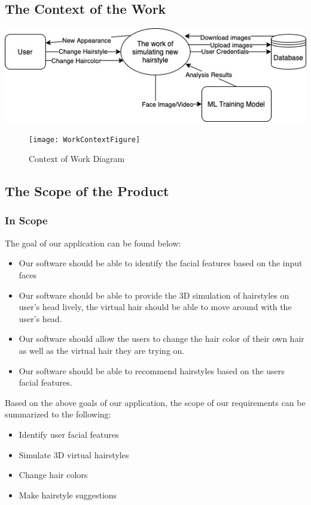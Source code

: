 \documentclass[12pt]{article}
\begin{document}
\subsection{The Context of the Work}
\graphicspath{ {./context_work_diagram.jpg/} }
\includegraphics[width=\textwidth]{context_work_diagram}
\begin{figure}[h!]
\begin{center}
 \texttt{[image: WorkContextFigure]}
\caption{Context of Work Diagram}
\label{Fig_SystemContext} 
\end{center}
\end{figure}

\subsection{The Scope of the Product}
 \subsubsection{In Scope}
The goal of our application can be found below:
 \begin{itemize}
     \item Our software should be able to identify the facial features based on the input faces
     \item Our software should be able to provide the 3D simulation of hairstyles on user's head lively, the virtual hair should be able to move around with the user's head.
     \item Our software should allow the users to change the hair color of their own hair as well as the virtual hair they are trying on.
     \item Our software should be able to recommend hairstyles based on the users facial features.
 \end{itemize}
 
 \noindent
 Based on the above goals of our application, the scope of our requirements can be summarized to the following:
 \begin{itemize}
     \item Identify user facial features
     \item Simulate 3D virtual hairstyles
     \item Change hair colors
     \item Make hairstyle suggestions
 \end{itemize}
\end{document}
